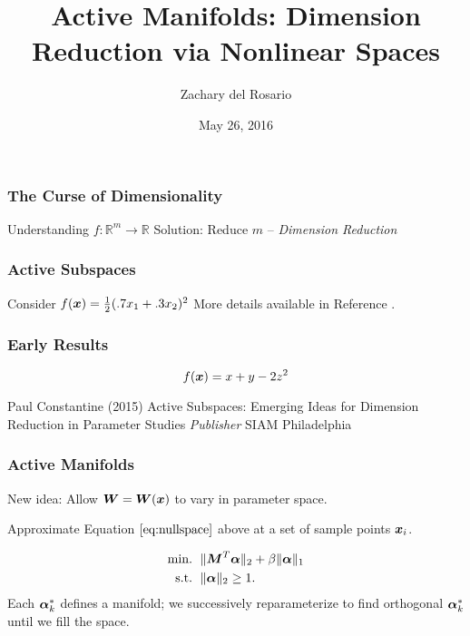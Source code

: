\documentclass{beamer}
\title[Active Manifolds]{Active Manifolds: Dimension Reduction via Nonlinear Spaces} %
\author{Zachary del Rosario} %
\date{May 26, 2016} %
\begin{document}
\begin{frame}
\titlepage %
\end{frame}


\begin{frame}
\frametitle{The Curse of Dimensionality}
\centering
Understanding $f:\mathbb{R}^m\to\mathbb{R}$
Solution: Reduce $m$ -- \emph{Dimension Reduction}
\end{frame}


\begin{frame}
\frametitle{Active Subspaces}
\centering Consider $f(\boldsymbol{x}) = \frac{1}{2}(.7x_1+.3x_2)^2$
\bigskip
More details available in Reference \cite{p1}.
\end{frame}



\begin{frame}
\frametitle{Early Results}
\[f(\boldsymbol{x}) = x + y - 2z^2\]
\end{frame}


\begin{frame}
\begin{thebibliography}{99}
 Paul Constantine (2015)
\newblock Active Subspaces: Emerging Ideas for Dimension Reduction in Parameter Studies
\newblock \emph{Publisher} SIAM Philadelphia
\end{thebibliography}
\end{frame}


\begin{frame}
\frametitle{Active Manifolds}
New idea: Allow $\boldsymbol{W}=\boldsymbol{W}(\boldsymbol{x})$ to vary in parameter space.

\bigskip
Approximate Equation $\ref{eq:nullspace}$ above at a set of sample points $\boldsymbol{x}_i$.

\bigskip
\begin{equation}
\begin{aligned}
\text{min. }&\, \|\boldsymbol{M}^T\boldsymbol{\alpha}\|_2 + \beta\|\boldsymbol{\alpha}\|_1 \\
\text{s.t. }&\, \|\boldsymbol{\alpha}\|_2 \geq 1.
\end{aligned}
\end{equation}
Each $\boldsymbol{\alpha}^*_k$ defines a manifold; we successively reparameterize to find orthogonal $\boldsymbol{\alpha}^*_k$ until we fill the space.
\end{frame}

\end{document}
